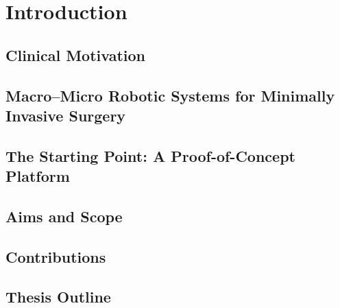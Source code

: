 \chapter{Introduction}
\label{ch:introduction}

\section{Clinical Motivation}
\label{sec:intro-motivation}

\section{Macro--Micro Robotic Systems for Minimally Invasive Surgery}
\label{sec:intro-macro-micro}

\section{The Starting Point: A Proof-of-Concept Platform}
\label{sec:intro-baseline}

\section{Aims and Scope}
\label{sec:intro-aims}

\section{Contributions}
\label{sec:intro-contributions}

\section{Thesis Outline}
\label{sec:intro-outline}
